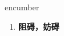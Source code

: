 
\begin{frame}
{\huge encumber}
\begin{center}
\begin{enumerate}\Large
  \item \textbf{阻碍，妨碍}
\end{enumerate}
\end{center}
\end{frame}
